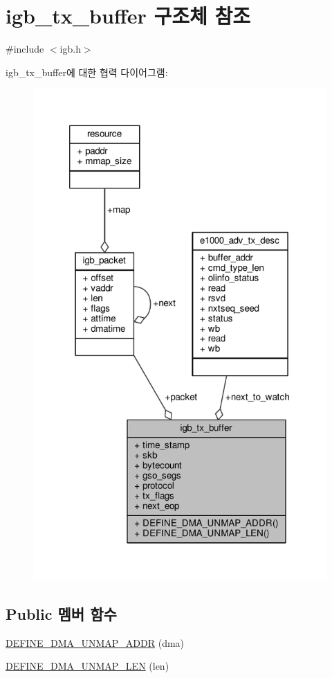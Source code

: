 \hypertarget{structigb__tx__buffer}{}\section{igb\+\_\+tx\+\_\+buffer 구조체 참조}
\label{structigb__tx__buffer}


{\ttfamily \#include $<$igb.\+h$>$}



igb\+\_\+tx\+\_\+buffer에 대한 협력 다이어그램\+:
\nopagebreak
\begin{figure}[H]
\begin{center}
\leavevmode
\includegraphics[width=320pt]{structigb__tx__buffer__coll__graph}
\end{center}
\end{figure}
\subsection*{Public 멤버 함수}
\begin{DoxyCompactItemize}
\item 
\hyperlink{structigb__tx__buffer_a40756902d60364da47173347d36a0e30}{D\+E\+F\+I\+N\+E\+\_\+\+D\+M\+A\+\_\+\+U\+N\+M\+A\+P\+\_\+\+A\+D\+DR} (dma)
\item 
\hyperlink{structigb__tx__buffer_a2fe7841cc38daf4fb430524d71ecef2e}{D\+E\+F\+I\+N\+E\+\_\+\+D\+M\+A\+\_\+\+U\+N\+M\+A\+P\+\_\+\+L\+EN} (len)
\end{DoxyCompactItemize}
